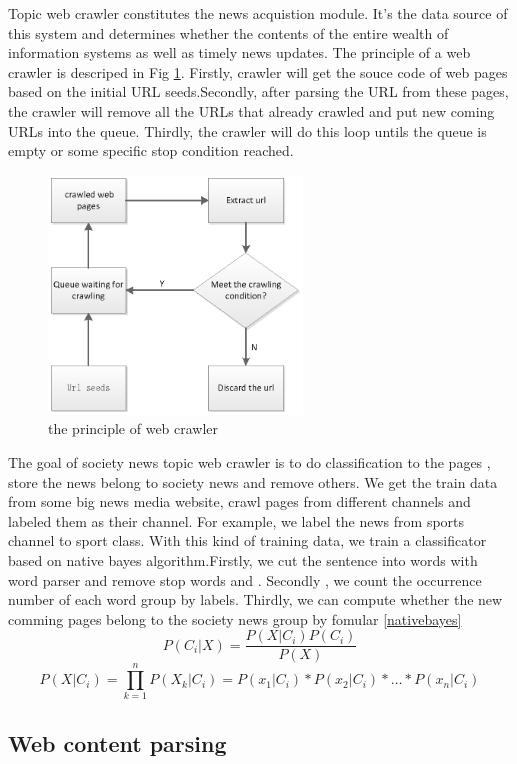 \documentclass[conference]{IEEEtran}
\begin{document}
Topic web crawler constitutes the news acquistion module. It's the data source of this system and determines whether the contents of the entire wealth of information systems as well as timely news updates. The principle of a web crawler is descriped in  Fig \ref{fig:crawler}. Firstly, crawler will get the souce code of web pages based on the initial URL seeds.Secondly,  after parsing the URL from these pages, the crawler will remove all the URLs that already crawled and put new coming URLs into the queue. Thirdly, the crawler will do this loop untils the queue is empty or some specific stop condition reached. 
\begin{figure}
\centering
\includegraphics[height=2.5in]{crawler}
\caption{the principle of web crawler}
\label{fig:crawler}
\end{figure}
The goal of society news topic web crawler is to do classification to the pages , store the news belong to society news and remove others. We get the train data from some big news media website, crawl pages from different channels and labeled them as their channel. For example, we label the news from sports channel to sport class. With this kind of training data, we train a classificator based on native bayes algorithm.Firstly, we cut the sentence into words with word parser and  remove stop words and . Secondly ,  we count the occurrence number of each word group by labels. Thirdly, we can compute  whether the new comming pages belong to the society news group by fomular \ref{nativebayes}
\begin{equation}
P(C_i|X) = \frac{P(X|C_i) P(C_i)}{P(X)}
\end{equation}
\begin{equation}
P(X|C_i) = \prod_{k=1}^n P(X_k|C_i) = P(x_1|C_i) * P(x_2|C_i)* \dots * P(x_n|C_i)
\end{equation}


\subsection{Web content parsing}
\end{document}
